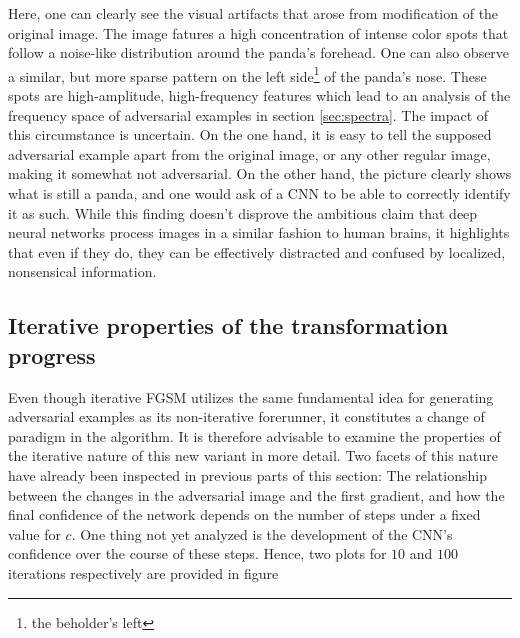 \documentclass[11pt, a4paper]{article}
\begin{document}
Here, one can clearly see the visual artifacts that arose from modification of the original image. The image fatures a high concentration of intense color spots that follow a noise-like distribution around the panda's forehead. One can also observe a similar, but more sparse pattern on the left side\footnote{the beholder's left} of the panda's nose. These spots are high-amplitude, high-frequency features which lead to an analysis of the frequency space of adversarial examples in section \ref{sec:spectra}. The impact of this circumstance is uncertain. On the one hand, it is easy to tell the supposed adversarial example apart from the original image, or any other regular image, making it somewhat not adversarial. On the other hand, the picture clearly shows what is still a panda, and one would ask of a CNN to be able to correctly identify it as such. While this finding doesn't disprove the ambitious claim that deep neural networks process images in a similar fashion to human brains, it highlights that even if they do, they can be effectively distracted and confused by localized, nonsensical information.


\subsection{Iterative properties of the transformation progress}
Even though iterative FGSM utilizes the same fundamental idea for generating adversarial examples as its non-iterative forerunner, it constitutes a change of paradigm in the algorithm. It is therefore advisable to examine the properties of the iterative nature of this new variant in more detail. Two facets of this nature have already been inspected in previous parts of this section: The relationship between the changes in the adversarial image and the first gradient, and how the final confidence of the network depends on the number of steps under a fixed value for $c$. One thing not yet analyzed is the development of the CNN's confidence over the course of these steps. Hence, two plots for $10$ and $100$ iterations respectively are provided in figure
\end{document}
